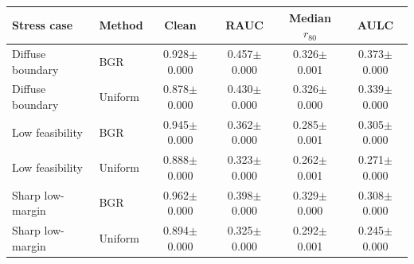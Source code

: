 \begin{tabular}{llcccc}
\hline
Stress case & Method & Clean & RAUC & Median $r_{80}$ & AULC \\
\hline
Diffuse boundary & BGR & 0.928$\pm$0.000 & 0.457$\pm$0.000 & 0.326$\pm$0.001 & 0.373$\pm$0.000 \\
Diffuse boundary & Uniform & 0.878$\pm$0.000 & 0.430$\pm$0.000 & 0.326$\pm$0.000 & 0.339$\pm$0.000 \\
Low feasibility & BGR & 0.945$\pm$0.000 & 0.362$\pm$0.000 & 0.285$\pm$0.001 & 0.305$\pm$0.000 \\
Low feasibility & Uniform & 0.888$\pm$0.000 & 0.323$\pm$0.000 & 0.262$\pm$0.001 & 0.271$\pm$0.000 \\
Sharp low-margin & BGR & 0.962$\pm$0.000 & 0.398$\pm$0.000 & 0.329$\pm$0.000 & 0.308$\pm$0.000 \\
Sharp low-margin & Uniform & 0.894$\pm$0.000 & 0.325$\pm$0.000 & 0.292$\pm$0.001 & 0.245$\pm$0.000 \\
\hline
\end{tabular}

